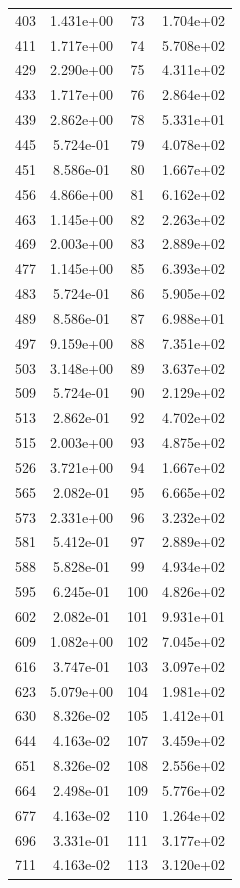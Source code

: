 \documentclass[12pt]{article}
\begin{document}
\begin{longtable}{@{}cccc@{}}
403 & 1.431e+00 & 73 & 1.704e+02 \\
411 & 1.717e+00 & 74 & 5.708e+02 \\
429 & 2.290e+00 & 75 & 4.311e+02 \\
433 & 1.717e+00 & 76 & 2.864e+02 \\
439 & 2.862e+00 & 78 & 5.331e+01 \\
445 & 5.724e-01 & 79 & 4.078e+02 \\
451 & 8.586e-01 & 80 & 1.667e+02 \\
456 & 4.866e+00 & 81 & 6.162e+02 \\
463 & 1.145e+00 & 82 & 2.263e+02 \\
469 & 2.003e+00 & 83 & 2.889e+02 \\
477 & 1.145e+00 & 85 & 6.393e+02 \\
483 & 5.724e-01 & 86 & 5.905e+02 \\
489 & 8.586e-01 & 87 & 6.988e+01 \\
497 & 9.159e+00 & 88 & 7.351e+02 \\
503 & 3.148e+00 & 89 & 3.637e+02 \\
509 & 5.724e-01 & 90 & 2.129e+02 \\
513 & 2.862e-01 & 92 & 4.702e+02 \\
515 & 2.003e+00 & 93 & 4.875e+02 \\
526 & 3.721e+00 & 94 & 1.667e+02 \\
565 & 2.082e-01 & 95 & 6.665e+02 \\
573 & 2.331e+00 & 96 & 3.232e+02 \\
581 & 5.412e-01 & 97 & 2.889e+02 \\
588 & 5.828e-01 & 99 & 4.934e+02 \\
595 & 6.245e-01 & 100 & 4.826e+02 \\
602 & 2.082e-01 & 101 & 9.931e+01 \\
609 & 1.082e+00 & 102 & 7.045e+02 \\
616 & 3.747e-01 & 103 & 3.097e+02 \\
623 & 5.079e+00 & 104 & 1.981e+02 \\
630 & 8.326e-02 & 105 & 1.412e+01 \\
644 & 4.163e-02 & 107 & 3.459e+02 \\
651 & 8.326e-02 & 108 & 2.556e+02 \\
664 & 2.498e-01 & 109 & 5.776e+02 \\
677 & 4.163e-02 & 110 & 1.264e+02 \\
696 & 3.331e-01 & 111 & 3.177e+02 \\
711 & 4.163e-02 & 113 & 3.120e+02 \\

\end{longtable}
\end{document}
